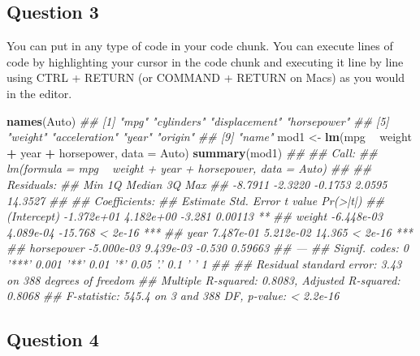 \documentclass[]{article}
\newenvironment{Shaded}{\begin{snugshade}}{\end{snugshade}}
\newcommand{\CommentTok}[1]{\textcolor[rgb]{0.56,0.35,0.01}{\textit{#1}}}
\newcommand{\DataTypeTok}[1]{\textcolor[rgb]{0.13,0.29,0.53}{#1}}
\newcommand{\KeywordTok}[1]{\textcolor[rgb]{0.13,0.29,0.53}{\textbf{#1}}}
\newcommand{\NormalTok}[1]{#1}
\newcommand{\OperatorTok}[1]{\textcolor[rgb]{0.81,0.36,0.00}{\textbf{#1}}}
\newcommand{\StringTok}[1]{\textcolor[rgb]{0.31,0.60,0.02}{#1}}
\begin{document}
\hypertarget{question-3}{%
\subsection{Question 3}\label{question-3}}

You can put in any type of code in your code chunk. You can execute
lines of code by highlighting your cursor in the code chunk and
executing it line by line using CTRL + RETURN (or COMMAND + RETURN on
Macs) as you would in the editor.

\begin{Shaded}
\begin{Highlighting}[]
\KeywordTok{names}\NormalTok{(Auto)}
\CommentTok{## [1] "mpg"          "cylinders"    "displacement" "horsepower"  }
\CommentTok{## [5] "weight"       "acceleration" "year"         "origin"      }
\CommentTok{## [9] "name"}
\NormalTok{mod1 <-}\StringTok{ }\KeywordTok{lm}\NormalTok{(mpg }\OperatorTok{~}\StringTok{ }\NormalTok{weight }\OperatorTok{+}\StringTok{ }\NormalTok{year }\OperatorTok{+}\StringTok{ }\NormalTok{horsepower, }\DataTypeTok{data =}\NormalTok{ Auto)}
\KeywordTok{summary}\NormalTok{(mod1)}
\CommentTok{## }
\CommentTok{## Call:}
\CommentTok{## lm(formula = mpg ~ weight + year + horsepower, data = Auto)}
\CommentTok{## }
\CommentTok{## Residuals:}
\CommentTok{##     Min      1Q  Median      3Q     Max }
\CommentTok{## -8.7911 -2.3220 -0.1753  2.0595 14.3527 }
\CommentTok{## }
\CommentTok{## Coefficients:}
\CommentTok{##               Estimate Std. Error t value Pr(>|t|)    }
\CommentTok{## (Intercept) -1.372e+01  4.182e+00  -3.281  0.00113 ** }
\CommentTok{## weight      -6.448e-03  4.089e-04 -15.768  < 2e-16 ***}
\CommentTok{## year         7.487e-01  5.212e-02  14.365  < 2e-16 ***}
\CommentTok{## horsepower  -5.000e-03  9.439e-03  -0.530  0.59663    }
\CommentTok{## ---}
\CommentTok{## Signif. codes:  0 '***' 0.001 '**' 0.01 '*' 0.05 '.' 0.1 ' ' 1}
\CommentTok{## }
\CommentTok{## Residual standard error: 3.43 on 388 degrees of freedom}
\CommentTok{## Multiple R-squared:  0.8083, Adjusted R-squared:  0.8068 }
\CommentTok{## F-statistic: 545.4 on 3 and 388 DF,  p-value: < 2.2e-16}
\end{Highlighting}
\end{Shaded}

\hypertarget{question-4}{%
\subsection{Question 4}\label{question-4}}
\end{document}
